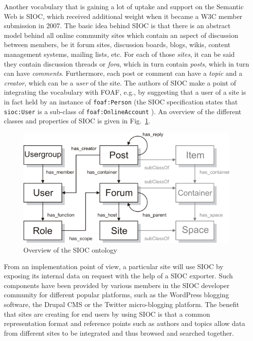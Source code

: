 \documentclass[twoside]{fast_latex}
\begin{document}
Another vocabulary that is gaining a lot of uptake and support on the Semantic Web is SIOC, which received additional weight when it became a W3C member submission in 2007. The basic idea behind SIOC is that there is an abstract model behind all online community sites which contain an aspect of discussion between members, be it forum sites, discussion boards, blogs, wikis, content management systems, mailing lists, etc. For each of those \emph{sites}, it can be said they contain discussion threads or \emph{fora}, which in turn contain \emph{posts}, which in turn can have \emph{comments}. Furthermore, each post or comment can have a \emph{topic} and a \emph{creator}, which can be a \emph{user} of the site. The authors of SIOC make a point of integrating the vocabulary with FOAF, e.g., by suggesting that a user of a site is in fact held by an instance of \texttt{foaf:Person} (the SIOC specification states that \texttt{sioc:User} is a sub-class of \texttt{foaf:OnlineAccount} \cite{sioc_spec2009}). An overview of the different classes and properties of SIOC is given in Fig.~\ref{fig:sioc_overview}.

\begin{figure}
  \begin{center}
    \includegraphics[width=0.75\linewidth]{images/sioc_overview}
    \caption{Overview of the SIOC ontology}
    \label{fig:sioc_overview}
  \end{center}
\end{figure}

From an implementation point of view, a particular site will use SIOC by exposing its internal data on request with the help of a SIOC exporter. Such components have been provided by various members in the SIOC developer community for different popular platforms, such as the WordPress blogging software, the Drupal CMS or the Twitter micro-blogging platform. The benefit that sites are creating for end users by using SIOC is that a common representation format and reference points such as authors and topics allow data from different sites to be integrated and thus browsed and searched together.
\end{document}
